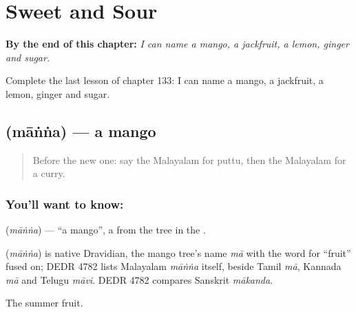 
\chapter{Sweet and Sour}
\label{ch:ml-sweet-and-sour}

\begin{chapteropening}
\textbf{By the end of this chapter:} \emph{I can name a mango, a jackfruit, a lemon, ginger and sugar.}

Complete the last lesson of chapter 133: I can name a mango, a jackfruit, a lemon, ginger and sugar.
\end{chapteropening}

\section[\texorpdfstring{\ml{മാങ്ങ} (māṅṅa)}{മാങ്ങ (māṅṅa)}]{ (māṅṅa) — a mango}

\label{lesson:ML-C133-mango}



\begin{quote}
Before the new one: say the Malayalam for puttu, then the Malayalam for a curry.
\end{quote}

\subsection*{You'll want to know: }
\textbf{} (\emph{māṅṅa}) — \textquotedblleft{}a mango\textquotedblright{}, a \textbf{} from the tree in the \textbf{}.

\begin{cousinweb}
\textbf{} (\emph{māṅṅa}) is native Dravidian, the mango tree's name \emph{mā} with the word for \textquotedblleft{}fruit\textquotedblright{} fused on; DEDR 4782 lists Malayalam \emph{māṅṅa} itself, beside Tamil \emph{mā}, Kannada \emph{mā} and Telugu \emph{māvi}. DEDR 4782 compares Sanskrit \emph{mākanda}.
\end{cousinweb}

\begin{grammarlens}[title={What you've built}]
The summer fruit.
\end{grammarlens}

